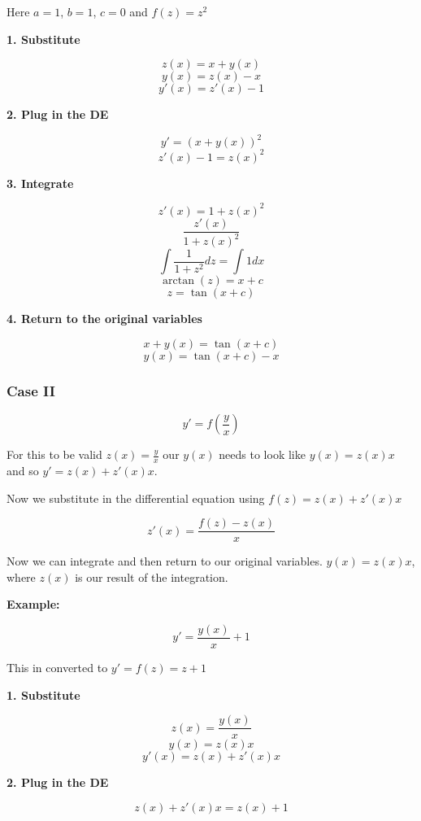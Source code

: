 Here \(a = 1\), \(b = 1\), \(c = 0\) and \(f(z) = z^2\)
\vspace{\baselineskip}

\textbf{1. Substitute}

\[
    z(x) = x + y(x)
\]
\[
    y(x) = z(x) - x
\]
\[
    y'(x) = z'(x) - 1
\]

\textbf{2. Plug in the DE}

\[
    y' = {(x + y(x))}^2
\]
\[
    z'(x) - 1 = {z(x)}^2
\]

\textbf{3. Integrate}

\[
    z'(x) = 1 + {z(x)}^2
\]
\[
    \frac{z'(x)}{1 + {z(x)}^2}
\]
\[
    \int \frac{1}{1 + z^2} dz = \int 1 dx
\]
\[
    \arctan (z) = x + c
\]
\[
    z = \tan(x + c)
\]

\textbf{4. Return to the original variables}

\[
    x + y(x) = \tan(x + c)
\]
\[
    y(x) = \tan(x + c) - x
\]

\subsubsection{Case II}

\[
    y' = f(\frac{y}{x})
\]

For this to be valid \(z(x) = \frac{y}{x}\) our \(y(x)\) needs to look like \(y(x) = z(x)x\) 
and so \(y' = z(x) + z'(x)x\).
\vspace{\baselineskip}

Now we substitute in the differential equation using \(f(z) = z(x) + z'(x)x\)

\[
    z'(x) = \frac{f(z) - z(x)}{x}
\]

Now we can integrate and then return to our original variables. \(y(x) = z(x)x \), where \(z(x)\) is our
result of the integration.
\vspace{\baselineskip}

\textbf{Example:}
\vspace{\baselineskip}

\[
    y' = \frac{y(x)}{x} + 1
\]

This in converted to \(y' = f(z) = z + 1\)
\vspace{\baselineskip}

\textbf{1. Substitute}

\[
    z(x) = \frac{y(x)}{x}
\]
\[
    y(x) = z(x)x
\]
\[
    y'(x) = z(x) + z'(x)x
\]

\textbf{2. Plug in the DE}

\[
    z(x) + z'(x)x = z(x) + 1
\]

